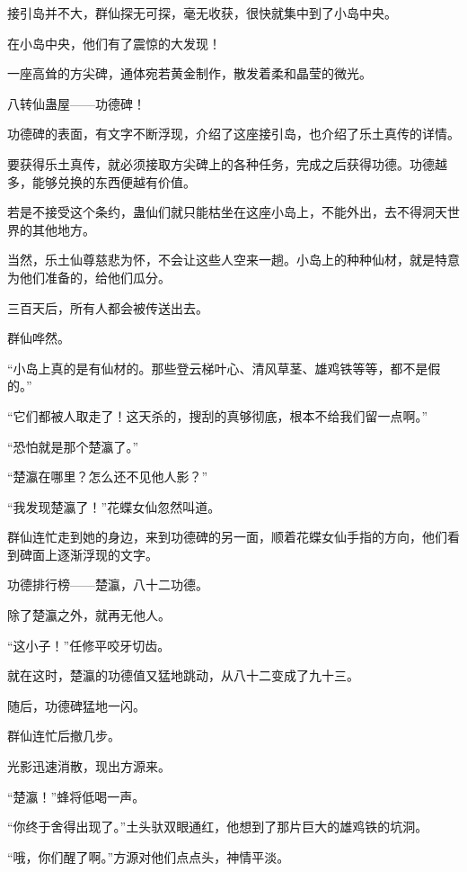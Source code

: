 
\begin{this_body}

接引岛并不大，群仙探无可探，毫无收获，很快就集中到了小岛中央。

在小岛中央，他们有了震惊的大发现！

一座高耸的方尖碑，通体宛若黄金制作，散发着柔和晶莹的微光。

八转仙蛊屋——功德碑！

功德碑的表面，有文字不断浮现，介绍了这座接引岛，也介绍了乐土真传的详情。

要获得乐土真传，就必须接取方尖碑上的各种任务，完成之后获得功德。功德越多，能够兑换的东西便越有价值。

若是不接受这个条约，蛊仙们就只能枯坐在这座小岛上，不能外出，去不得洞天世界的其他地方。

当然，乐土仙尊慈悲为怀，不会让这些人空来一趟。小岛上的种种仙材，就是特意为他们准备的，给他们瓜分。

三百天后，所有人都会被传送出去。

群仙哗然。

“小岛上真的是有仙材的。那些登云梯叶心、清风草茎、雄鸡铁等等，都不是假的。”

“它们都被人取走了！这天杀的，搜刮的真够彻底，根本不给我们留一点啊。”

“恐怕就是那个楚瀛了。”

“楚瀛在哪里？怎么还不见他人影？”

“我发现楚瀛了！”花蝶女仙忽然叫道。

群仙连忙走到她的身边，来到功德碑的另一面，顺着花蝶女仙手指的方向，他们看到碑面上逐渐浮现的文字。

功德排行榜——楚瀛，八十二功德。

除了楚瀛之外，就再无他人。

“这小子！”任修平咬牙切齿。

就在这时，楚瀛的功德值又猛地跳动，从八十二变成了九十三。

随后，功德碑猛地一闪。

群仙连忙后撤几步。

光影迅速消散，现出方源来。

“楚瀛！”蜂将低喝一声。

“你终于舍得出现了。”土头驮双眼通红，他想到了那片巨大的雄鸡铁的坑洞。

“哦，你们醒了啊。”方源对他们点点头，神情平淡。


\end{this_body}
